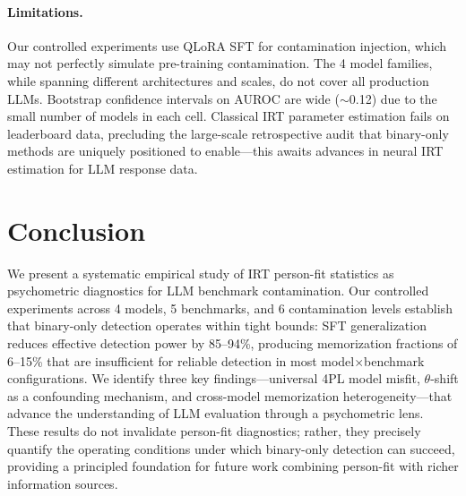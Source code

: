 \documentclass[11pt]{article}
\begin{document}
\paragraph{Limitations.} Our controlled experiments use QLoRA SFT for contamination injection, which may not perfectly simulate pre-training contamination. The 4 model families, while spanning different architectures and scales, do not cover all production LLMs. Bootstrap confidence intervals on AUROC are wide ($\sim$0.12) due to the small number of models in each cell. Classical IRT parameter estimation fails on leaderboard data, precluding the large-scale retrospective audit that binary-only methods are uniquely positioned to enable---this awaits advances in neural IRT estimation for LLM response data.

\section{Conclusion}
\label{sec:conclusion}

We present a systematic empirical study of IRT person-fit statistics as psychometric diagnostics for LLM benchmark contamination. Our controlled experiments across 4 models, 5 benchmarks, and 6 contamination levels establish that binary-only detection operates within tight bounds: SFT generalization reduces effective detection power by 85--94\%, producing memorization fractions of 6--15\% that are insufficient for reliable detection in most model$\times$benchmark configurations. We identify three key findings---universal 4PL model misfit, $\theta$-shift as a confounding mechanism, and cross-model memorization heterogeneity---that advance the understanding of LLM evaluation through a psychometric lens. These results do not invalidate person-fit diagnostics; rather, they precisely quantify the operating conditions under which binary-only detection can succeed, providing a principled foundation for future work combining person-fit with richer information sources.


\end{document}
